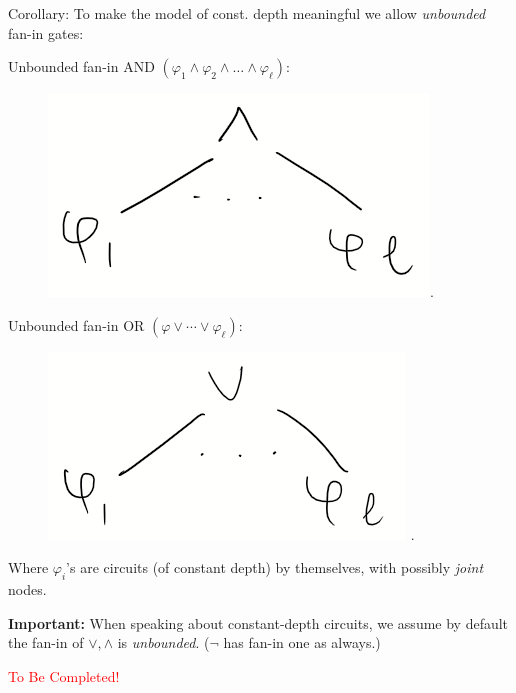 Corollary: To make the model of const. depth
meaningful we allow \textit{unbounded} fan-in gates:

Unbounded fan-in AND $\left(\varphi_1 \wedge \varphi_2 \wedge \ldots \wedge \varphi_\ell\right)$:
\begin{figure}
    \centering
    \includegraphics[width=0.2\linewidth]{images/AND.png}.
    \label{fig:enter-label}
\end{figure}

Unbounded fan-in OR $\left(\varphi\lor \cdots \lor \varphi_{\ell}\right)$:
\begin{figure}
    \centering
    \includegraphics[width=0.25\linewidth]{images/OR.png}
.
    \label{fig:enter-label}
\end{figure}
Where $\varphi_i$'s are circuits (of constant depth) by themselves, with possibly \emph{joint} nodes. 


\begin{svgraybox}
\textbf{Important:}  When speaking about constant-depth circuits, we assume by default the fan-in of $\lor, \land$ is \emph{unbounded}. ($\neg$ has fan-in one as always.)
\end{svgraybox}

\textcolor{red}{
\begin{Huge}
To Be Completed!\end{Huge}}


